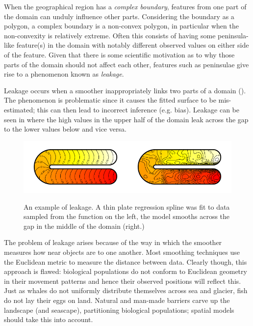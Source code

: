 When the geographical region has a \emph{complex boundary}, features from one part of the domain can unduly influence other parts. Considering the boundary as a polygon, a complex boundary is a non-convex polygon, in particular when the non-convexity is relatively extreme. Often this consists of having some peninsula-like feature(s) in the domain with notably different observed values on either side of the feature. Given that there is some scientific motivation as to why those parts of the domain should not affect each other, features such as peninsulae give rise to a phenomenon known as \emph{leakage}.

Leakage occurs when a smoother inappropriately links two parts of a domain (\cite{soap}). The phenomenon is problematic since it causes the fitted surface to be mis-estimated; this can then lead to incorrect inference (e.g. bias). Leakage can be seen in  where the high values in the upper half of the domain leak across the gap to the lower values below and vice versa.

\begin{figure}
\centering
\includegraphics{intro/figs/ramsay-leak.pdf}\\
\caption{An example of leakage. A thin plate regression spline was fit to data sampled from the function on the left, the model smooths across the gap in the middle of the domain (right.)}
\label{leakage}
\end{figure}

The problem of leakage arises because of the way in which the smoother measures how near objects are to one another. Most smoothing techniques use the Euclidean metric to measure the distance between data. Clearly though, this approach is flawed: biological populations do not conform to Euclidean geometry in their movement patterns and hence their observed positions will reflect this. Just as whales do not uniformly distribute themselves across sea and glacier, fish do not lay their eggs on land. Natural and man-made barriers carve up the landscape (and seascape), partitioning biological populations; spatial models should take this into account.

